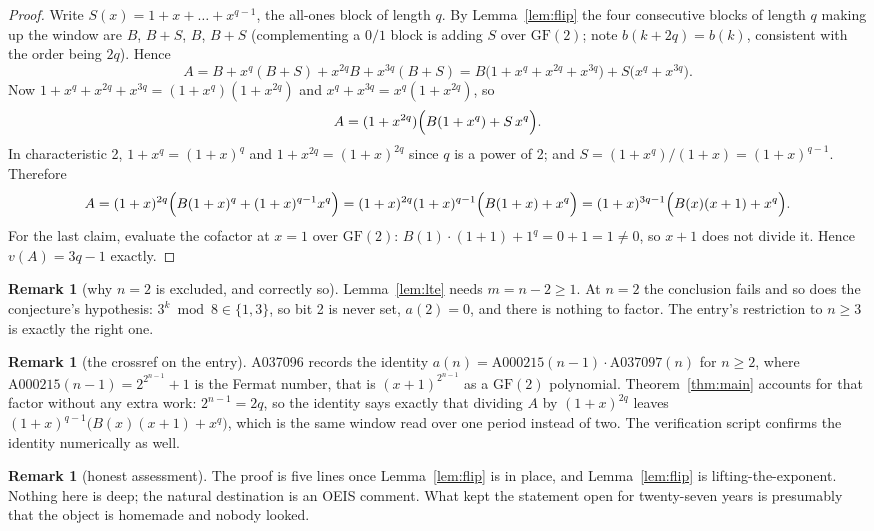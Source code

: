 \documentclass[11pt,a4paper]{article}
\theoremstyle{plain}
\theoremstyle{definition}
\newtheorem{remark}[theorem]{Remark}
\begin{document}
\begin{proof}
Write $S(x)=1+x+\dots+x^{q-1}$, the all-ones block of length $q$. By
Lemma~\ref{lem:flip} the four consecutive blocks of length $q$ making up the window are
$B$, $B+S$, $B$, $B+S$ (complementing a $0/1$ block is adding $S$ over $\mathrm{GF}(2)$;
note $b(k+2q)=b(k)$, consistent with the order being $2q$). Hence
\[
  A=B+x^{q}(B+S)+x^{2q}B+x^{3q}(B+S)
   =B\bigl(1+x^{q}+x^{2q}+x^{3q}\bigr)+S\bigl(x^{q}+x^{3q}\bigr).
\]
Now $1+x^{q}+x^{2q}+x^{3q}=(1+x^{q})(1+x^{2q})$ and $x^{q}+x^{3q}=x^{q}(1+x^{2q})$, so
\[
  A=(1+x^{2q})\Bigl(B(1+x^{q})+S\,x^{q}\Bigr).
\]
In characteristic 2, $1+x^{q}=(1+x)^{q}$ and $1+x^{2q}=(1+x)^{2q}$ since $q$ is a power of
2; and $S=(1+x^{q})/(1+x)=(1+x)^{q-1}$. Therefore
\[
  A=(1+x)^{2q}\Bigl(B(1+x)^{q}+(1+x)^{q-1}x^{q}\Bigr)
   =(1+x)^{2q}(1+x)^{q-1}\Bigl(B(1+x)+x^{q}\Bigr)
   =(1+x)^{3q-1}\Bigl(B(x)(x+1)+x^{q}\Bigr).
\]
For the last claim, evaluate the cofactor at $x=1$ over $\mathrm{GF}(2)$:
$B(1)\cdot(1+1)+1^{q}=0+1=1\ne0$, so $x+1$ does not divide it. Hence $v(A)=3q-1$ exactly.
\end{proof}

\begin{remark}[why $n=2$ is excluded, and correctly so]
Lemma~\ref{lem:lte} needs $m=n-2\ge1$. At $n=2$ the conclusion fails and so does the
conjecture's hypothesis: $3^{k}\bmod8\in\{1,3\}$, so bit 2 is never set, $a(2)=0$, and
there is nothing to factor. The entry's restriction to $n\ge3$ is exactly the right one.
\end{remark}

\begin{remark}[the crossref on the entry]
A037096 records the identity $a(n)=\mathrm{A000215}(n-1)\cdot\mathrm{A037097}(n)$ for
$n\ge2$, where $\mathrm{A000215}(n-1)=2^{2^{n-1}}+1$ is the Fermat number, that is
$(x+1)^{2^{n-1}}$ as a $\mathrm{GF}(2)$ polynomial. Theorem~\ref{thm:main} accounts for
that factor without any extra work: $2^{n-1}=2q$, so the identity says exactly that
dividing $A$ by $(1+x)^{2q}$ leaves $(1+x)^{q-1}\bigl(B(x)(x+1)+x^{q}\bigr)$, which is the
same window read over one period instead of two. The verification script confirms the
identity numerically as well.
\end{remark}

\begin{remark}[honest assessment]
The proof is five lines once Lemma~\ref{lem:flip} is in place, and Lemma~\ref{lem:flip} is
lifting-the-exponent. Nothing here is deep; the natural destination is an OEIS comment.
What kept the statement open for twenty-seven years is presumably that the object is
homemade and nobody looked.
\end{remark}
\end{document}
